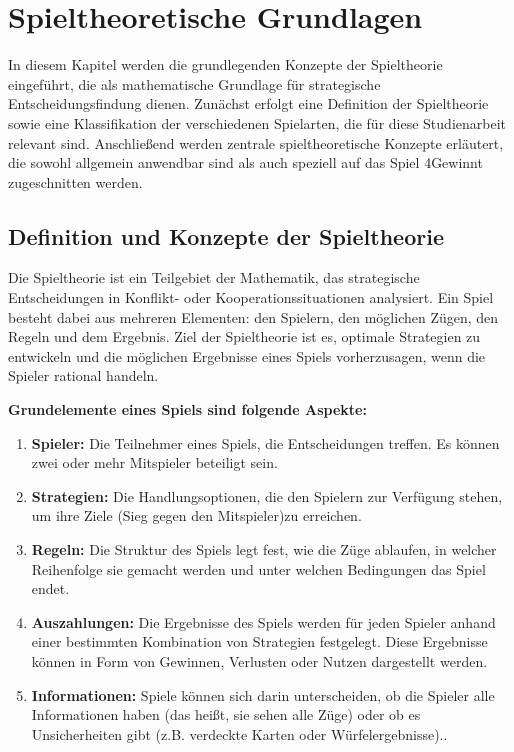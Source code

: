\chapter{Spieltheoretische Grundlagen}
In diesem Kapitel werden die grundlegenden Konzepte der Spieltheorie eingeführt, die als mathematische Grundlage für strategische Entscheidungsfindung dienen. Zunächst erfolgt eine Definition der Spieltheorie sowie eine Klassifikation der verschiedenen Spielarten, die für diese Studienarbeit relevant sind. Anschließend werden zentrale spieltheoretische Konzepte erläutert, die sowohl allgemein anwendbar sind als auch speziell auf das Spiel 4Gewinnt zugeschnitten werden.

\section{Definition und Konzepte der Spieltheorie}
Die Spieltheorie ist ein Teilgebiet der Mathematik, das strategische Entscheidungen in Konflikt- oder Kooperationssituationen analysiert. Ein Spiel besteht dabei aus mehreren Elementen: den Spielern, den möglichen Zügen, den Regeln und dem Ergebnis. Ziel der Spieltheorie ist es, optimale Strategien zu entwickeln und die möglichen Ergebnisse eines Spiels vorherzusagen, wenn die Spieler rational handeln.

\textbf{Grundelemente eines Spiels sind folgende Aspekte:}

\begin{enumerate}
	\item \textbf{Spieler:} Die Teilnehmer eines Spiels, die Entscheidungen treffen. Es können zwei oder mehr Mitspieler beteiligt sein.
	\item \textbf{Strategien:} Die Handlungsoptionen, die den Spielern zur Verfügung stehen, um ihre Ziele (Sieg gegen den Mitspieler)zu erreichen.
	\item \textbf{Regeln:} Die Struktur des Spiels legt fest, wie die Züge ablaufen, in welcher Reihenfolge sie gemacht werden und unter welchen Bedingungen das Spiel endet.
	\item \textbf{Auszahlungen:} Die Ergebnisse des Spiels werden für jeden Spieler anhand einer bestimmten Kombination von Strategien festgelegt. Diese Ergebnisse können in Form von Gewinnen, Verlusten oder Nutzen dargestellt werden.
	\item \textbf{Informationen:} Spiele können sich darin unterscheiden, ob die Spieler alle Informationen haben (das heißt, sie sehen alle Züge) oder ob es Unsicherheiten gibt (z.B. verdeckte Karten oder Würfelergebnisse).\autocite{holler_einfuhrung_2019}.
\end{enumerate}

